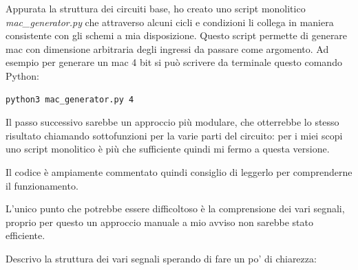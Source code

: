 \documentclass[12pt, letterpaper]{article}
\begin{document}
Appurata la struttura dei circuiti base, ho creato uno script monolitico \textit{mac\_generator.py} che attraverso alcuni cicli e condizioni li collega in maniera consistente con gli schemi a mia disposizione.
Questo script permette di generare mac con dimensione arbitraria degli ingressi da passare come argomento.
Ad esempio per generare un mac 4 bit si può scrivere da terminale questo comando Python: 

\begin{lstlisting}
python3 mac_generator.py 4  
\end{lstlisting}

Il passo successivo sarebbe un approccio più modulare, che otterrebbe lo stesso risultato chiamando sottofunzioni per la varie parti del circuito: per i miei scopi uno script monolitico è più che sufficiente quindi mi fermo a questa versione.

Il codice è ampiamente commentato quindi consiglio di leggerlo per comprenderne il funzionamento.

L'unico punto che potrebbe essere difficoltoso è la comprensione dei vari segnali, proprio per questo un approccio manuale a mio avviso non sarebbe stato efficiente.

Descrivo la struttura dei vari segnali sperando di fare un po' di chiarezza:
\end{document}
